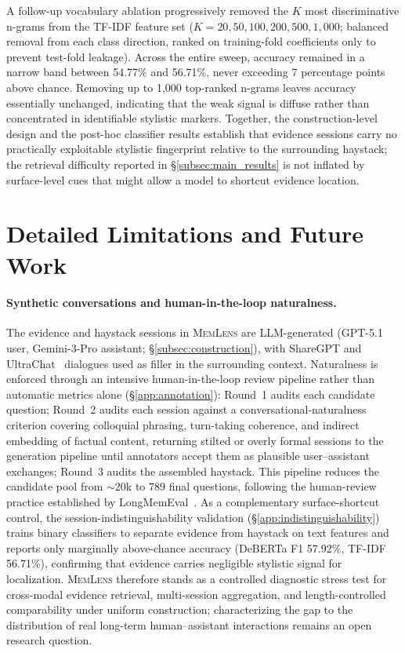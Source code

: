 \documentclass{llmxive}
\providecommand{\bench}{\textsc{MemLens}}
\begin{document}
A follow-up vocabulary ablation progressively removed the $K$ most discriminative n-grams from the TF-IDF feature set ($K = 20, 50, 100, 200, 500, 1{,}000$; balanced removal from each class direction, ranked on training-fold coefficients only to prevent test-fold leakage). Across the entire sweep, accuracy remained in a narrow band between 54.77\% and 56.71\%, never exceeding 7 percentage points above chance. Removing up to 1{,}000 top-ranked n-grams leaves accuracy essentially unchanged, indicating that the weak signal is diffuse rather than concentrated in identifiable stylistic markers. Together, the construction-level design and the post-hoc classifier results establish that evidence sessions carry no practically exploitable stylistic fingerprint relative to the surrounding haystack; the retrieval difficulty reported in \S\ref{subsec:main_results} is not inflated by surface-level cues that might allow a model to shortcut evidence location.


\section{Detailed Limitations and Future Work}
\label{app:limitations}

\paragraph{Synthetic conversations and human-in-the-loop naturalness.}
The evidence and haystack sessions in \bench{} are LLM-generated (GPT-5.1 user, Gemini-3-Pro assistant; \S\ref{subsec:construction}), with ShareGPT and UltraChat~\cite{ding2023enhancing} dialogues used as filler in the surrounding context. Naturalness is enforced through an intensive human-in-the-loop review pipeline rather than automatic metrics alone (\S\ref{app:annotation}): Round~1 audits each candidate question; Round~2 audits each session against a conversational-naturalness criterion covering colloquial phrasing, turn-taking coherence, and indirect embedding of factual content, returning stilted or overly formal sessions to the generation pipeline until annotators accept them as plausible user--assistant exchanges; Round~3 audits the assembled haystack. This pipeline reduces the candidate pool from ${\sim}20$k to 789 final questions, following the human-review practice established by LongMemEval~\cite{wu2025longmemevalbenchmarkingchatassistants}. As a complementary surface-shortcut control, the session-indistinguishability validation (\S\ref{app:indistinguishability}) trains binary classifiers to separate evidence from haystack on text features and reports only marginally above-chance accuracy (DeBERTa F1 57.92\%, TF-IDF 56.71\%), confirming that evidence carries negligible stylistic signal for localization. \bench{} therefore stands as a controlled diagnostic stress test for cross-modal evidence retrieval, multi-session aggregation, and length-controlled comparability under uniform construction; characterizing the gap to the distribution of real long-term human--assistant interactions remains an open research question.
\end{document}
